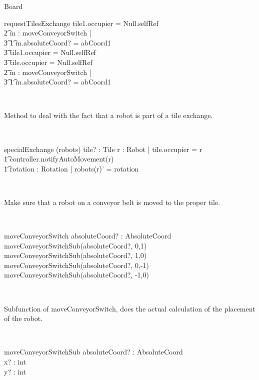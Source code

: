 \begin{class}{Board}
\begin{schema}{requestTilesExchange}
tile1.occupier \not = Null.selfRef\\ \t2
\THEN \exists m : moveConveyorSwitch | \\ \t3 \t1 m.absoluteCoord? = abCoord1 \\ \t3
\IF tile1.occupier = Null.selfRef \\ \t3
tile.occupier \not = Null.selfRef \\ \t2
\THEN \exists m : moveConveyorSwitch | \\ \t3 \t1 m.absoluteCoord? = abCoord1
\end{schema} \\
\znewpage
\begin{classcom}
Method to deal with the fact that a robot is part of a tile exchange.
\end{classcom} \\
\begin{schema}{specialExchange}
\Delta (robots)
tile? : Tile
\where
\exists r : Robot | tile.occupier = r \implies \\ \t1
controller.notifyAutoMovement(r) \\ \t1
\exists rotation : Rotation | robots(r)' = rotation
\end{schema} \\
\begin{classcom}
Make sure that a robot on a conveyor belt is moved to the proper tile.
\end{classcom} \\
\begin{schema}{moveConveyorSwitch}
absoluteCoord? : AbsoluteCoord \\
\where
moveConveyorSwitchSub(absoluteCoord?, 0,1) \\
moveConveyorSwitchSub(absoluteCoord?, 1,0) \\
moveConveyorSwitchSub(absoluteCoord?, 0,-1) \\
moveConveyorSwitchSub(absoluteCoord?, -1,0) \\
\end{schema}\\
\begin{classcom}
Subfunction of moveConveyorSwitch, does the actual calculation of the placement of the robot.
\end{classcom} \\
\begin{schema}{moveConveyorSwitchSub}
absoluteCoord? : AbsoluteCoord \\
x? : int \\
y? : int \\

\end{schema}
\end{class}
